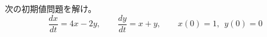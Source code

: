 
次の初期値問題を解け。
\[
\frac{dx}{dt} = 4x - 2y, \qquad \frac{dy}{dt} = x + y, \qquad x(0) = 1,\ \ y(0) = 0
\]
